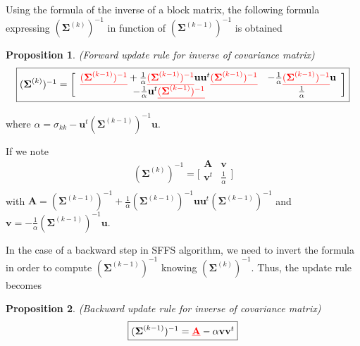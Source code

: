 \documentclass[a4paper,11pt,DIV=16,abstracton]{scrartcl}
\newcommand*{\equl}[2]{%
    \textcolor{#1}{\underline{#2}}%
}
\newtheorem{prop}{Proposition}
\begin{document}
        Using the formula of the inverse of a block matrix, the following formula expressing $(\boldsymbol{\Sigma}^{(k)})^{-1}$ in function of $(\boldsymbol{\Sigma}^{(k-1)})^{-1}$ is obtained
        \begin{prop}
        \label{eq:update-inv}
            (Forward update rule for inverse of covariance matrix)
            \begin{equation*}
                \fbox{$
                (\boldsymbol{\Sigma}^{(k)})^{-1} =
                \bigg[\begin{array}{cc}
                \equl{red}{(\boldsymbol{\Sigma}^{(k-1)})^{-1}} + \frac{1}{\alpha} \equl{red}{(\boldsymbol{\Sigma}^{(k-1)})^{-1}} \mathbf{u} \mathbf{u}^t \equl{red}{(\boldsymbol{\Sigma}^{(k-1)})^{-1}} & - \frac{1}{\alpha} \equl{red}{(\boldsymbol{\Sigma}^{(k-1)})^{-1}} \mathbf{u} \\
                - \frac{1}{\alpha} \mathbf{u}^t \equl{red}{(\boldsymbol{\Sigma}^{(k-1)})^{-1}}                                                                          & \frac{1}{\alpha}                  \\
                \end{array}\bigg]
                $}
            \end{equation*}
        \end{prop}
        where $ \alpha = \sigma_{kk} - \mathbf{u}^t (\boldsymbol{\Sigma}^{(k-1)})^{-1} \mathbf{u} $.

        If we note
        \begin{equation*}
            (\boldsymbol{\Sigma}^{(k)})^{-1} =
            \bigg[\begin{array}{cc}
            \mathbf{A}   & \mathbf{v} \\
            \mathbf{v}^t & \frac{1}{\alpha} \\
            \end{array}\bigg]
        \end{equation*}
        with $\mathbf{A} = (\boldsymbol{\Sigma}^{(k-1)})^{-1} + \frac{1}{\alpha} (\boldsymbol{\Sigma}^{(k-1)})^{-1} \mathbf{u} \mathbf{u}^t (\boldsymbol{\Sigma}^{(k-1)})^{-1}$ and $\mathbf{v} = - \frac{1}{\alpha} (\boldsymbol{\Sigma}^{(k-1)})^{-1} \mathbf{u}$.

        In the case of a backward step in SFFS algorithm, we need to invert the formula in order to compute $(\boldsymbol{\Sigma}^{(k-1)})^{-1}$ knowing $(\boldsymbol{\Sigma}^{(k)})^{-1}$. Thus, the update rule becomes
        \begin{prop}
            (Backward update rule for inverse of covariance matrix)
            \begin{equation*}
                \fbox{$(\boldsymbol{\Sigma}^{(k-1)})^{-1} = \equl{red}{\mathbf{A}} - \alpha \mathbf{v} \mathbf{v}^t$}
            \end{equation*}
        \end{prop}
\end{document}
